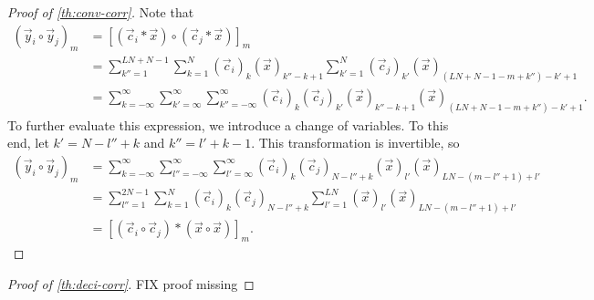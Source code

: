 \documentclass[a4paper, openany, oneside]{memoir}
\begin{document}
\begin{proof}[Proof of \cref{th:conv-corr}]
    Note that
    \begin{align*}
        (\vec{y}_i \circ \vec{y}_j)_m
        &= [(\vec{c}_i \ast \vec{x}) \circ (\vec{c}_j \ast \vec{x})]_m \\
        &=\sum_{k''=1}^{LN+N-1}\sum_{k=1}^N (\vec{c}_i)_k (\vec{x})_{k''-k+1}\sum_{k'=1}^{N}(\vec{c}_j)_{k'}(\vec{x})_{(LN+N-1-m+k'')-k'+1} \\
        &=\sum_{k=-\infty}^\infty\sum_{k'=\infty}^{\infty}\sum_{k''=-\infty}^{\infty} (\vec{c}_i)_k (\vec{c}_j)_{k'}(\vec{x})_{k''-k+1}(\vec{x})_{(LN+N-1-m+k'')-k'+1}.
    \end{align*}
    To further evaluate this expression, we introduce a change of variables. To this end, let $k' = N -l'' +k$ and $k'' = l' + k - 1$. This transformation is invertible, so
    \begin{align*}
        (\vec{y}_i \circ \vec{y}_j)_m
        &=\sum_{k=-\infty}^\infty\sum_{l''=-\infty}^{\infty}\sum_{l'=\infty}^{\infty} (\vec{c}_i)_k (\vec{c}_j)_{N -l'' +k}(\vec{x})_{l'}
        (\vec{x})_{LN-(m-l'' + 1)+l'} \\
        &=\sum_{l''=1}^{2N-1}\sum_{k=1}^{N}(\vec{c}_i)_k (\vec{c}_j)_{N -l'' +k}\sum_{l'=1}^{LN}(\vec{x})_{l'}
        (\vec{x})_{LN-(m-l'' + 1)+l'} \\
        &=[(\vec{c}_i \circ \vec{c}_j) \ast (\vec{x} \circ \vec{x})]_m.
    \end{align*}
\end{proof}
\begin{proof}[Proof of \cref{th:deci-corr}]
    FIX proof missing
\end{proof}
\end{document}
